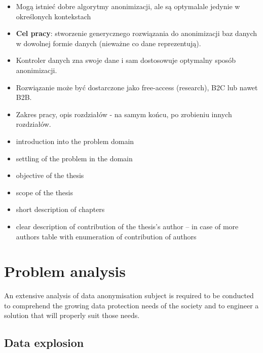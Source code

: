 \documentclass[a4paper,twoside,12pt]{book}
\begin{document}
\begin{itemize}
\item Mogą istnieć dobre algorytmy anonimizacji, ale są optymalale jedynie w określonych kontekstach

\item \textbf{Cel pracy}: stworzenie generycznego rozwiązania do anonimizacji baz danych w dowolnej formie danych (nieważne co dane reprezentują).

\item Kontroler danych zna swoje dane i sam dostosowuje optymalny sposób anonimizacji.

\item Rozwiązanie może być dostarczone jako free-access (research), B2C lub nawet B2B.

\item Zakres pracy, opis rozdziałów - na samym końcu, po zrobieniu innych rozdziałów.
\normalsize

\end{itemize}
\color{black}
\normalsize


\begin{itemize}
\item introduction into the problem domain
\item settling of the problem in the domain
\item objective of the thesis 
\item scope of the thesis
\item short description of chapters
\item clear description of contribution of the thesis's author – in case of more authors table with enumeration of contribution of authors
\end{itemize}



\chapter{Problem analysis}

An extensive analysis of data anonymisation subject is required to be conducted to comprehend the growing data protection needs of the society and to engineer a solution that will properly suit those needs.

\section{Data explosion}
\end{document}

